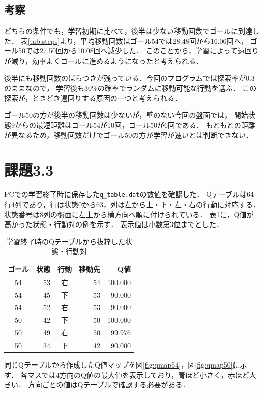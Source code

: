 \documentclass[a4paper,11pt]{ltjsarticle}
\begin{document}
\subsection*{考察}
どちらの条件でも，学習初期に比べて，後半は少ない移動回数でゴールに到達した．
表\ref{tab:steps}より，平均移動回数はゴール54では28.48回から16.06回へ，
ゴール50では27.50回から10.08回へ減少した．
このことから，学習によって遠回りが減り，効率よくゴールに進めるようになったと考えられる．

後半にも移動回数のばらつきが残っている．今回のプログラムでは探索率が0.3のままなので，
学習後も30\%の確率でランダムに移動可能な行動を選ぶ．
この探索が，ときどき遠回りする原因の一つと考えられる．

ゴール50の方が後半の移動回数は少ないが，壁のない今回の盤面では，
開始状態9からの最短距離はゴール54が10回，ゴール50が6回である．
もともとの距離が異なるため，移動回数だけでゴール50の方が学習が速いとは判断できない．

\clearpage
\section*{課題3.3}
PCでの学習終了時に保存した\texttt{q\_table.dat}の数値を確認した．
Qテーブルは64行4列であり，行は状態0から63，列は左から上・下・左・右の行動に対応する．
状態番号は8列の盤面に左上から横方向へ順に付けられている．
表\ref{tab:qvalues}に，Q値が高かった状態・行動対の例を示す．
表示値は小数第3位までとした．

\begin{table}[H]
\centering
\caption{学習終了時のQテーブルから抜粋した状態・行動対}
\label{tab:qvalues}
\begin{tabular}{crcrr}
\hline
ゴール & 状態 & 行動 & 移動先 & Q値 \\
\hline
54 & 53 & 右 & 54 & 100.000 \\
54 & 45 & 下 & 53 & 90.000 \\
54 & 52 & 右 & 53 & 90.000 \\
50 & 42 & 下 & 50 & 100.000 \\
50 & 49 & 右 & 50 & 99.976 \\
50 & 34 & 下 & 42 & 90.000 \\
\hline
\end{tabular}
\end{table}

同じQテーブルから作成したQ値マップを図\ref{fig:qmap54}，図\ref{fig:qmap50}に示す．
各マスでは4方向のQ値の最大値を表示しており，青ほど小さく，赤ほど大きい．
方向ごとの値はQテーブルで確認する必要がある．
\end{document}
